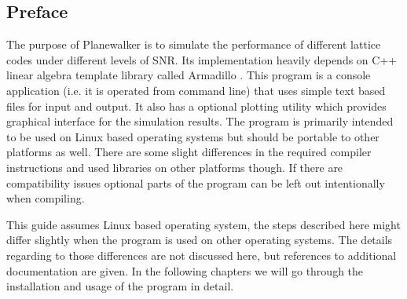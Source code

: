 \documentclass[english,12pt,a4paper,pdftex,sci,utf8]{aaltothesis}
\begin{document}

\subsection{Preface}
The purpose of Planewalker is to simulate the performance of different lattice codes under different levels of SNR. Its implementation heavily depends on C++ linear algebra template library called Armadillo \cite{arma}. This program is a console application (i.e. it is operated from command line) that uses simple text based files for input and output. It also has a optional plotting utility which provides graphical interface for the simulation results. The program is primarily intended to be used on Linux based operating systems but should be portable to other platforms as well. There are some slight differences in the required compiler instructions and used libraries on other platforms though. If there are compatibility issues optional parts of the program can be left out intentionally when compiling. 
\par This guide assumes Linux based operating system, the steps described here might differ slightly when the program is used on other operating systems. The details regarding to those differences are not discussed here, but references to additional documentation are given. In the following chapters we will go through the installation and usage of the program in detail. 
\end{document}
